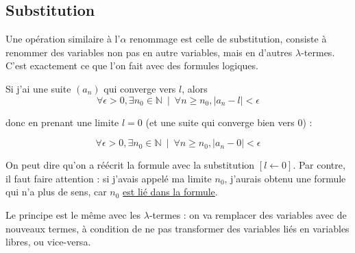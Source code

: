 \documentclass[11pt]{article}
\begin{document}
\subsection{Substitution}

Une opération similaire à l'$\alpha$ renommage est celle de substitution, consiste à renommer des variables non pas en autre variables, mais en d'autres $\lambda$-termes. C'est exactement ce que l'on fait avec des formules logiques.

Si j'ai une suite $\left(a_n\right)$ qui converge vers $l$, alors
$$\forall\epsilon>0, \exists n_0\in\mathbb{N}~\mid~\forall n\ge n_0, \left|a_n-l\right|<\epsilon$$

donc en prenant une limite $l=0$  (et une suite qui converge bien vers $0$) :

$$\forall\epsilon>0, \exists n_0\in\mathbb{N}~\mid~\forall n\ge n_0, \left|a_n-0\right|<\epsilon$$

On peut dire qu'on a réécrit la formule avec la substitution $\left[l\leftarrow0\right]$. Par contre, il faut faire attention : si j'avais appelé ma limite $n_0$, j'aurais obtenu une formule qui n'a plus de sens, car $n_0$ \underline{est lié dans la formule}.

Le principe est le même avec les $\lambda$-termes : on va remplacer des variables avec de nouveaux termes, à condition de ne pas transformer des variables liés en variables libres, ou vice-versa.
\end{document}
